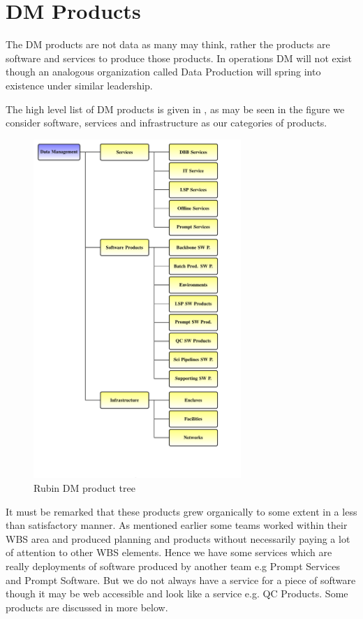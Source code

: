\section {DM Products} \label{sec:softproducts}
The DM products are not data as many may think, rather the products are software and services to produce those
products.
In operations DM will not exist though an analogous organization called Data Production will spring into existence under similar leadership.

The high level list of DM products is given in , as may be seen in the  figure we consider software, services and infrastructure as our categories of products.


\begin{figure}
\begin{centering}
\includegraphics[width=0.7\textwidth]{images/ProductTree}
	\caption{Rubin DM product tree \label{fig:pt}}
\end{centering}
\end{figure}

It must be remarked that these products grew organically to some extent in a less than satisfactory manner.
As mentioned earlier some teams worked within their WBS area and produced planning and products without necessarily paying a lot of attention to other WBS elements. Hence we have some services which are really deployments of software produced by another team e.g Prompt Services and Prompt Software. But we do not always have a service for a piece of software though it may be web accessible and look like a service e.g. QC Products.
Some products are discussed in more below.



